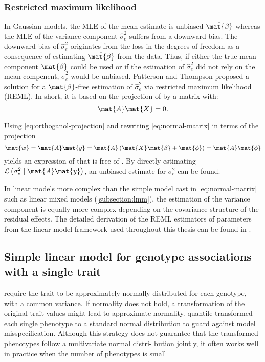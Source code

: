 \subsubsection{Restricted maximum likelihood}
In Gaussian models, the MLE of the mean estimate is unbiased \(\hat{\mat{\beta}}\) whereas the MLE of the variance component \(\hat{\sigma}^2_e \) suffers from a downward bias. The downward bias of \(\hat{\sigma}^2_e \) originates from the loss in the degrees of freedom as a consequence of estimating \(\hat{\mat{\beta}}\) from the data. Thus, if either the true mean component \(\mat{\beta}\) could be used or if the estimation of \(\hat{\sigma}^2_e \) did not rely on the mean compenent, \(\hat{\sigma}^2_e \) would be unbiased. Patterson and Thompson \citep{Patterson1977} proposed a solution for a \(\mat{\beta}\)-free estimation of \(\hat{\sigma}^2_e \) via restricted maximum likelihood (REML). In short, it is based on the projection  of  by a matrix  with:
\begin{equation}
\label{eq:orthoganol-projection}
\mat{A}\mat{X}=0.
\end{equation}

Using \cref{eq:orthoganol-projection} and rewriting \cref{eq:normal-matrix} in terms of the projection 
\begin{equation}
\mat{w} = \mat{A}\mat{y} = \mat{A}\left(\mat{X}\mat{\beta} + \mat{\phi}\right) = \mat{A}\mat{\phi} 
\end{equation}
yields an expression of  that is free of \tmat{\beta}. By directly estimating \(\mathcal{L} \left(\sigma^2_e \mid \mat{A}\mat{y}\right)\), an unbiased estimate for \(\sigma^2_e\) can be found. 

In linear models more complex than the simple model cast in \cref{eq:normal-matrix} such as linear mixed models (\cref{subsection:lmm}), the estimation of the variance component is equally more complex depending on the covariance structure of the residual effects. The detailed derivation of the REML estimators of parameters from the linear model framework used  throughout this thesis can be found in \citep{}. 

\subsection{Simple linear model for genotype associations with a single trait}
\label{subsection:lm-uv}
require the trait to be approximately normally distributed for each genotype, with a common variance. 
If normality does not hold, a transformation of the original trait values might lead to approximate normality.
quantile-transformed each single phenotype to a standard normal distribution to guard against model misspecification. Although this strategy does not guarantee that the transformed phenotypes follow a multivariate normal distri- bution jointly, it often works well in practice when the number of phenotypes is small \citep{Stephens2013,Zhou2014}

